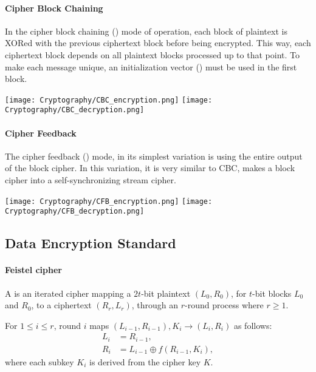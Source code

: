\documentclass[a4paper, 11pt, openany]{book}
\begin{document}
\paragraph{Cipher Block Chaining}
In the cipher block chaining () mode of operation, each block of plaintext is XORed with the previous ciphertext block before being encrypted. This way, each ciphertext block depends on all plaintext blocks processed up to that point. To make each message unique, an initialization vector () must be used in the first block.


\begin{center}
    \texttt{[image: Cryptography/CBC\_encryption.png]}
    \texttt{[image: Cryptography/CBC\_decryption.png]}
\end{center}


\paragraph{Cipher Feedback}
The cipher feedback () mode, in its simplest variation is using the entire output of the block cipher. In this variation, it is very similar to CBC, makes a block cipher into a self-synchronizing stream cipher.



\begin{center}
    \texttt{[image: Cryptography/CFB\_encryption.png]}
    \texttt{[image: Cryptography/CFB\_decryption.png]}
\end{center}












\subsection{Data Encryption Standard}

\paragraph{Feistel cipher}
A  is an iterated cipher mapping a $2t$-bit plaintext $(L_0,R_0)$, for
$t$-bit blocks $L_0$ and $R_0$, to a ciphertext $(R_r, L_r)$, through an $r$-round process where $r \ge 1$.

For $1 \le i \le r$, round $i$ maps $(L_{i-1}, R_{i-1}), K_i \to (L_i,R_i)$ as follows:
\begin{align*}
    L_i &= R_{i-1},\\
    R_i &= L_{i-1} \oplus f(R_{i-1}, K_i),
\end{align*}
where each subkey $K_i$ is derived from the cipher key $K$.
\end{document}
